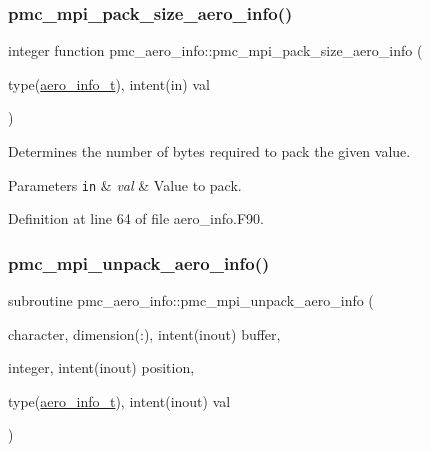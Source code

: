 \subsubsection{\texorpdfstring{pmc\+\_\+mpi\+\_\+pack\+\_\+size\+\_\+aero\+\_\+info()}{pmc\_mpi\_pack\_size\_aero\_info()}}
{\footnotesize\ttfamily integer function pmc\+\_\+aero\+\_\+info\+::pmc\+\_\+mpi\+\_\+pack\+\_\+size\+\_\+aero\+\_\+info (\begin{DoxyParamCaption}\item[{type(\mbox{\hyperlink{structpmc__aero__info_1_1aero__info__t}{aero\+\_\+info\+\_\+t}}), intent(in)}]{val }\end{DoxyParamCaption})}



Determines the number of bytes required to pack the given value. 


\begin{DoxyParams}[1]{Parameters}
\mbox{\tt in}  & {\em val} & Value to pack. \\
\hline
\end{DoxyParams}


Definition at line 64 of file aero\+\_\+info.\+F90.

\mbox{\label{namespacepmc__aero__info_a00bba9f51f794c076d7cb4eeb7f25eac}} 
\subsubsection{\texorpdfstring{pmc\+\_\+mpi\+\_\+unpack\+\_\+aero\+\_\+info()}{pmc\_mpi\_unpack\_aero\_info()}}
{\footnotesize\ttfamily subroutine pmc\+\_\+aero\+\_\+info\+::pmc\+\_\+mpi\+\_\+unpack\+\_\+aero\+\_\+info (\begin{DoxyParamCaption}\item[{character, dimension(\+:), intent(inout)}]{buffer,  }\item[{integer, intent(inout)}]{position,  }\item[{type(\mbox{\hyperlink{structpmc__aero__info_1_1aero__info__t}{aero\+\_\+info\+\_\+t}}), intent(inout)}]{val }\end{DoxyParamCaption})}



